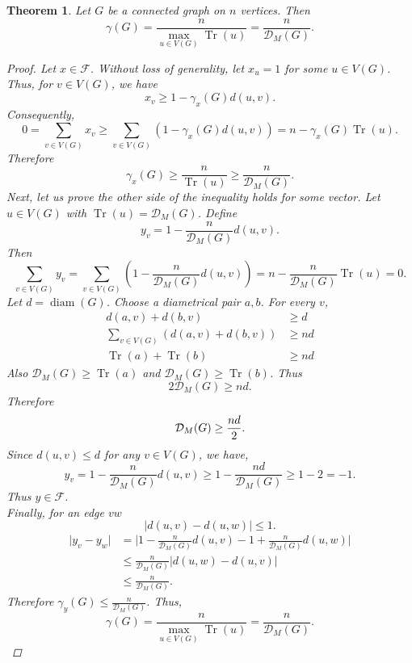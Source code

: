 \documentclass[10pt,a4paper]{amsart}
\newtheorem{theorem}{Theorem}
\DeclareMathOperator{\diam}{diam}
\DeclareMathOperator{\tr}{Tr}
\begin{document}
			\begin{theorem}\label{main theorem}
				Let $G$ be a connected graph on $n$ vertices. Then
				$$
				\gamma(G)=\frac{n}{\max\limits_{u \in V(G)}  \tr(u)}=\frac{n}{\mathcal{D}_M(G)}.
				$$
				
				\begin{proof}
					Let $x \in \mathcal{F}$. Without loss of generality, let $x_u=1$ for some $u \in V(G)$. 
					Thus, for $v \in V(G)$, we have
					$$
					x_v \geq 1- \gamma_x(G) d(u,v).
					$$
					Consequently,
					$$
					0=\sum\limits_{v \in V(G)} x_v\geq \sum\limits_{v \in V(G)} (1- \gamma_x(G) d(u,v))=n- \gamma_x(G) \tr(u).
					$$
					Therefore
					$$
					\gamma_x(G) \geq \frac{n}{\tr(u)}\geq \frac{n}{\mathcal{D}_M(G)}.
					$$
					Next, let us prove the other side of the inequality holds for some vector. Let $u \in V(G)$ with $\tr(u)=\mathcal{D}_M(G)$. Define
					$$
					y_v=1 - \frac{n}{\mathcal{D}_M(G)}d(u,v).
					$$
					Then
					$$
					\sum\limits_{v\in V(G)}y_v=\sum\limits_{v\in V(G)}\left(1 - \frac{n}{\mathcal{D}_M(G)}d(u,v)\right)=n-\frac{n}{\mathcal{D}_M(G)}\tr(u)=0.
					$$
					Let $d=\diam(G)$. Choose a diametrical pair $a,b$. For every $v$,
					\begin{align*}
						d(a,v)+d(b,v) &\geq d\\
						\sum\limits_{v \in V(G)}(d(a,v)+d(b,v))&\geq nd\\
						\tr(a)+\tr(b) &\geq nd
					\end{align*}
					Also $\mathcal{D}_M(G) \geq \tr(a)$ and $\mathcal{D}_M(G) \geq \tr(b)$. Thus
					$$
					2\mathcal{D}_M(G) \geq nd.
					$$
					Therefore 
					\begin{equation}
						\mathcal{D}_M(G) \geq \frac{nd}{2}.\notag
					\end{equation}
					Since $d(u,v) \leq d$ for any $v\in V(G)$, we have,
					$$
					y_v=1 - \frac{n}{\mathcal{D}_M(G)}d(u,v)\geq 1-\frac{nd}{\mathcal{D}_M(G)}\geq 1-2=-1.
					$$
					Thus $y \in \mathcal{F}$.\\
					Finally, for an edge $vw$
					$$
					\vert d(u,v) -d(u,w) \vert \leq 1.
					$$
					\begin{align*}
						\vert y_v -y_w\vert &=\vert 1 - \frac{n}{\mathcal{D}_M(G)}d(u,v)-1+\frac{n}{\mathcal{D}_M(G)}d(u,w)\vert\\
						&\leq \frac{n}{\mathcal{D}_M(G)}\vert d(u,w) -d(u,v) \vert \\
						& \leq\frac{n}{\mathcal{D}_M(G)}.
					\end{align*}
					Therefore $ \gamma_y(G) \leq \frac{n}{\mathcal{D}_M(G)}$. Thus, $$\gamma(G)=\frac{n}{\max\limits_{u \in V(G)}  \tr(u)}=\frac{n}{\mathcal{D}_M(G)}.$$
				\end{proof}
			\end{theorem}
\end{document}
